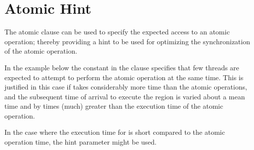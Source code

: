 \section{Atomic Hint}
\label{sec:atomic_hint}

The atomic  clause can be used to specify the
expected access to an atomic operation; thereby providing a hint
to be used for optimizing the synchronization of the atomic operation.

In the example below the  constant
in the  clause specifies that few threads are expected
to attempt to perform the atomic operation at the same time.
This is justified in this case if  takes considerably
more time than the atomic operations, and the subsequent time of
arrival to execute the  region is varied about a mean time
and by times (much) greater than the execution time of the atomic
operation.

In the case where the execution time for  is short
compared to the atomic operation time, the 
hint parameter might be used. 




